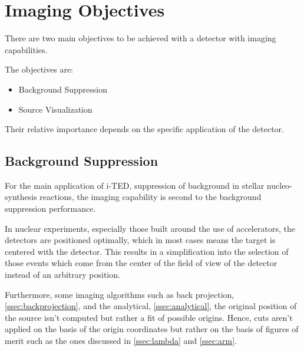 \chapter{Imaging Objectives}\label{ch:objectives}

There are two main objectives to be achieved with a detector with imaging capabilities.

The objectives are:
\begin{itemize}
    \item Background Suppression
    \item Source Visualization
\end{itemize}

Their relative importance depends on the specific application of the detector.

\section{Background Suppression}

For the main application of \ac{i-TED}, suppression of background in stellar nucleo-synthesis reactions, the imaging capability is second to the background suppression performance.

In nuclear experiments, especially those built around the use of accelerators, the detectors are positioned optimally, which in most cases means the target is centered with the detector. This results in a simplification into the selection of those events which come from the center of the field of view of the detector instead of an arbitrary position.

Furthermore, some imaging algorithms such as back projection, \ref{ssec:backprojection}, and the analytical, \ref{ssec:analytical}, the original position of the source isn't computed but rather a fit of possible origins. Hence, cuts aren't applied on the basis of the origin coordinates but rather on the basis of figures of merit such as the ones discussed in \ref{ssec:lambda} and \ref{ssec:arm}.

